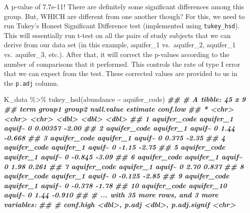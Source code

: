 \documentclass[
]{krantz}
\newenvironment{Shaded}{\begin{snugshade}}{\end{snugshade}}
\newcommand{\DocumentationTok}[1]{\textcolor[rgb]{0.56,0.35,0.01}{\textbf{\textit{#1}}}}
\newcommand{\FunctionTok}[1]{\textcolor[rgb]{0.00,0.00,0.00}{#1}}
\newcommand{\NormalTok}[1]{#1}
\newcommand{\SpecialCharTok}[1]{\textcolor[rgb]{0.00,0.00,0.00}{#1}}
\begin{document}
A p-value of 7.7e-11! There are definitely some significant differences among this group. But, WHICH are different from one another though? For this, we need to run Tukey's Honest Significant Difference test (implemented using \texttt{tukey\_hsd}). This will essentially run t-test on all the pairs of study subjects that we can derive from our data set (in this example, aquifer\_1 vs.~aquifer\_2, aquifer\_1 vs.~aquifer\_3, etc.). After that, it will correct the p-values according to the number of comparisons that it performed. This controls the rate of type I error that we can expect from the test. These corrected values are provided to us in the \texttt{p.adj} column.

\begin{Shaded}
\begin{Highlighting}[]
\NormalTok{K\_data }\SpecialCharTok{\%\textgreater{}\%}
  \FunctionTok{tukey\_hsd}\NormalTok{(abundance }\SpecialCharTok{\textasciitilde{}}\NormalTok{ aquifer\_code)}
\DocumentationTok{\#\# \# A tibble: 45 x 9}
\DocumentationTok{\#\#    term         group1     group2 null.value estimate conf.low}
\DocumentationTok{\#\#  * \textless{}chr\textgreater{}        \textless{}chr\textgreater{}      \textless{}chr\textgreater{}       \textless{}dbl\textgreater{}    \textless{}dbl\textgreater{}    \textless{}dbl\textgreater{}}
\DocumentationTok{\#\#  1 aquifer\_code aquifer\_1  aquif\textasciitilde{}          0  0.00357   {-}2.00 }
\DocumentationTok{\#\#  2 aquifer\_code aquifer\_1  aquif\textasciitilde{}          0  1.44      {-}0.668}
\DocumentationTok{\#\#  3 aquifer\_code aquifer\_1  aquif\textasciitilde{}          0  0.375     {-}2.35 }
\DocumentationTok{\#\#  4 aquifer\_code aquifer\_1  aquif\textasciitilde{}          0 {-}1.15      {-}2.75 }
\DocumentationTok{\#\#  5 aquifer\_code aquifer\_1  aquif\textasciitilde{}          0 {-}0.845     {-}3.09 }
\DocumentationTok{\#\#  6 aquifer\_code aquifer\_1  aquif\textasciitilde{}          0  1.98       0.261}
\DocumentationTok{\#\#  7 aquifer\_code aquifer\_1  aquif\textasciitilde{}          0  2.70       0.837}
\DocumentationTok{\#\#  8 aquifer\_code aquifer\_1  aquif\textasciitilde{}          0 {-}0.125     {-}2.85 }
\DocumentationTok{\#\#  9 aquifer\_code aquifer\_1  aquif\textasciitilde{}          0 {-}0.378     {-}1.78 }
\DocumentationTok{\#\# 10 aquifer\_code aquifer\_10 aquif\textasciitilde{}          0  1.44      {-}0.910}
\DocumentationTok{\#\# \# ... with 35 more rows, and 3 more variables:}
\DocumentationTok{\#\# \#   conf.high \textless{}dbl\textgreater{}, p.adj \textless{}dbl\textgreater{}, p.adj.signif \textless{}chr\textgreater{}}
\end{Highlighting}
\end{Shaded}
\end{document}
